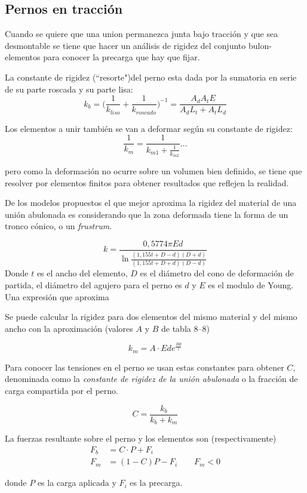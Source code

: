 \documentclass[twocolumn,10pt]{article}
\begin{document}
\subsection{Pernos en tracción}
Cuando se quiere que una union permanezca junta bajo tracción y que sea desmontable se tiene que hacer un análisis de rigidez del conjunto bulon-elementos para conocer la precarga que hay que fijar.

La constante de rigidez (``resorte")del perno esta dada por la sumatoria en serie de su parte roscada y su parte lisa:
$$k_b=\bigg( \frac{1}{k_{liso}}+\frac{1}{k_{roscado}} \bigg)^{-1}=\frac{A_dA_tE}{A_d L_t +A_tL_d} $$

Los elementos a unir también se van a deformar según su constante de rigidez:
$$ \frac{1}{k_m}=\frac{1}{k_{m1}+\frac{1}{k_{m2}} } \ldots$$

pero como la deformación no ocurre sobre un volumen bien definido, se tiene que resolver por elementos finitos para obtener resultados que reflejen la realidad. 

De los modelos propuestos el que mejor aproxima la rigidez del material de una unión abulonada es considerando que la zona deformada tiene la forma de un tronco cónico, o un \emph{frustrum}. 

$$k=\frac{0,5774 \pi Ed}{\ln \frac{(1,155t+D-d)(D+d)}{(1,155t+D+d)
(D-d)}} $$
Donde $t$ es el ancho del elemento, $D$ es el diámetro del cono de deformación de partida, el diámetro del agujero para el perno es $d$ y $E$ es el modulo de Young. Una expresión que aproxima  

Se puede calcular la rigidez para dos elementos del mismo material y del mismo ancho con la aproximación (valores $A$ y $B$ de tabla 8--8)

$$k_m=A\cdot Ed e^{\frac{Bd}{l}} $$

Para conocer las tensiones en el perno se usan estas constantes para obtener $C$, denominada como la \emph{constante de rigidez de la unión abulonada} o la fracción de carga compartida por el perno.

$$ C=\frac{k_b}{k_b+k_m}$$

La fuerzas resultante sobre el perno y los elementos son (respectivamente)
\begin{align*}
F_b&=C\cdot P+F_i \\
 F_m&=(1-C)P-F_i \qquad F_m<0
\end{align*}

donde $P$ es la carga aplicada y $F_i$ es la precarga.
\end{document}
